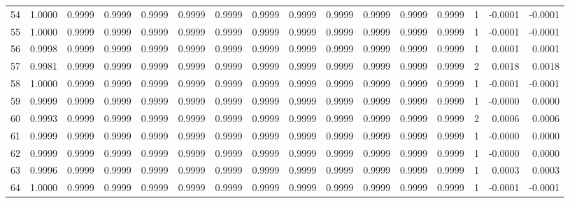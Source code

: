 \begin{tabular}{lrrrrrrrrrrrrrrr}
54  &      1.0000 &  0.9999 &  0.9999 &  0.9999 &  0.9999 &  0.9999 &  0.9999 &  0.9999 &  0.9999 &  0.9999 &   0.9999 &     0.9999 &      1 &                   -0.0001 &                    -0.0001 \\
55  &      1.0000 &  0.9999 &  0.9999 &  0.9999 &  0.9999 &  0.9999 &  0.9999 &  0.9999 &  0.9999 &  0.9999 &   0.9999 &     0.9999 &      1 &                   -0.0001 &                    -0.0001 \\
56  &      0.9998 &  0.9999 &  0.9999 &  0.9999 &  0.9999 &  0.9999 &  0.9999 &  0.9999 &  0.9999 &  0.9999 &   0.9999 &     0.9999 &      1 &                    0.0001 &                     0.0001 \\
57  &      0.9981 &  0.9999 &  0.9999 &  0.9999 &  0.9999 &  0.9999 &  0.9999 &  0.9999 &  0.9999 &  0.9999 &   0.9999 &     0.9999 &      2 &                    0.0018 &                     0.0018 \\
58  &      1.0000 &  0.9999 &  0.9999 &  0.9999 &  0.9999 &  0.9999 &  0.9999 &  0.9999 &  0.9999 &  0.9999 &   0.9999 &     0.9999 &      1 &                   -0.0001 &                    -0.0001 \\
59  &      0.9999 &  0.9999 &  0.9999 &  0.9999 &  0.9999 &  0.9999 &  0.9999 &  0.9999 &  0.9999 &  0.9999 &   0.9999 &     0.9999 &      1 &                   -0.0000 &                     0.0000 \\
60  &      0.9993 &  0.9999 &  0.9999 &  0.9999 &  0.9999 &  0.9999 &  0.9999 &  0.9999 &  0.9999 &  0.9999 &   0.9999 &     0.9999 &      2 &                    0.0006 &                     0.0006 \\
61  &      0.9999 &  0.9999 &  0.9999 &  0.9999 &  0.9999 &  0.9999 &  0.9999 &  0.9999 &  0.9999 &  0.9999 &   0.9999 &     0.9999 &      1 &                   -0.0000 &                     0.0000 \\
62  &      0.9999 &  0.9999 &  0.9999 &  0.9999 &  0.9999 &  0.9999 &  0.9999 &  0.9999 &  0.9999 &  0.9999 &   0.9999 &     0.9999 &      1 &                   -0.0000 &                     0.0000 \\
63  &      0.9996 &  0.9999 &  0.9999 &  0.9999 &  0.9999 &  0.9999 &  0.9999 &  0.9999 &  0.9999 &  0.9999 &   0.9999 &     0.9999 &      1 &                    0.0003 &                     0.0003 \\
64  &      1.0000 &  0.9999 &  0.9999 &  0.9999 &  0.9999 &  0.9999 &  0.9999 &  0.9999 &  0.9999 &  0.9999 &   0.9999 &     0.9999 &      1 &                   -0.0001 &                    -0.0001 \\

\end{tabular}
